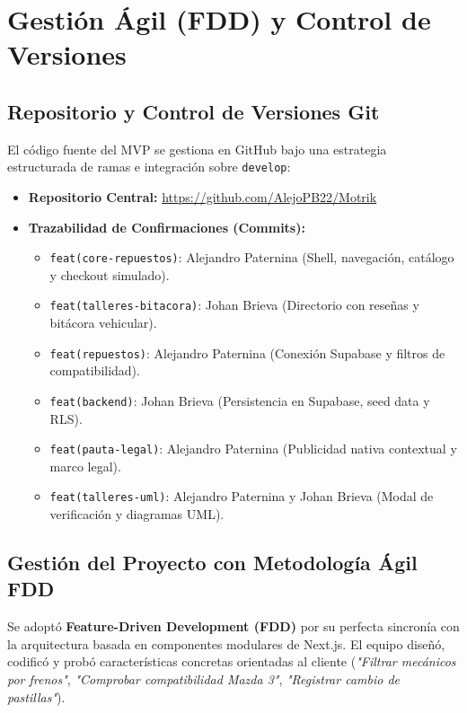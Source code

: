 \documentclass[11pt,letterpaper]{article}
\begin{document}
\newpage

\section{Gestión Ágil (FDD) y Control de Versiones}

\subsection{Repositorio y Control de Versiones Git}
El código fuente del MVP se gestiona en GitHub bajo una estrategia estructurada de ramas e integración sobre \texttt{develop}:
\begin{itemize}
    \item \textbf{Repositorio Central:} \url{https://github.com/AlejoPB22/Motrik}
    \item \textbf{Trazabilidad de Confirmaciones (Commits):}
    \begin{itemize}
        \item \texttt{feat(core-repuestos)}: Alejandro Paternina (Shell, navegación, catálogo y checkout simulado).
        \item \texttt{feat(talleres-bitacora)}: Johan Brieva (Directorio con reseñas y bitácora vehicular).
        \item \texttt{feat(repuestos)}: Alejandro Paternina (Conexión Supabase y filtros de compatibilidad).
        \item \texttt{feat(backend)}: Johan Brieva (Persistencia en Supabase, seed data y RLS).
        \item \texttt{feat(pauta-legal)}: Alejandro Paternina (Publicidad nativa contextual y marco legal).
        \item \texttt{feat(talleres-uml)}: Alejandro Paternina y Johan Brieva (Modal de verificación y diagramas UML).
    \end{itemize}
\end{itemize}

\subsection{Gestión del Proyecto con Metodología Ágil FDD}
Se adoptó \textbf{Feature-Driven Development (FDD)} por su perfecta sincronía con la arquitectura basada en componentes modulares de Next.js. El equipo diseñó, codificó y probó características concretas orientadas al cliente (\textit{"Filtrar mecánicos por frenos"}, \textit{"Comprobar compatibilidad Mazda 3"}, \textit{"Registrar cambio de pastillas"}).
\end{document}
